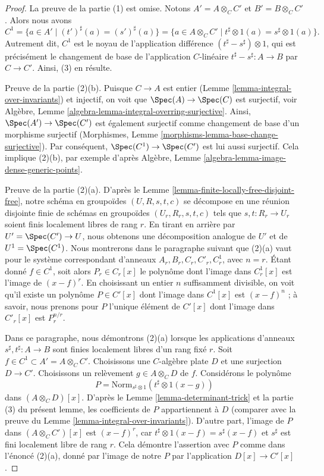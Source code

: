 \begin{proof}
La preuve de la partie (1) est omise. Notons $A' = A \otimes_C C'$ et
$B' = B \otimes_C C'$. Alors nous avons
$$
C^1
= \{a \in A' \mid (t')^\sharp(a) = (s')^\sharp(a) \}
= \{a \in A \otimes_C C' \mid t^\sharp \otimes 1(a) = s^\sharp \otimes 1(a) \}.
$$
Autrement dit, $C^1$ est le noyau de l'application différence
$(t^\sharp - s^\sharp) \otimes 1$, qui est précisément le changement de base
de l'application $C$-linéaire $t^\sharp - s^\sharp : A \to B$ par $C \to C'$.
Ainsi, (3) en résulte.

\medskip\noindent
Preuve de la partie (2)(b). Puisque $C \to A$ est entier
(Lemme \ref{lemma-integral-over-invariants}) et injectif, on voit que
$\Spec(A) \to \Spec(C)$ est surjectif, voir
Algèbre, Lemme \ref{algebra-lemma-integral-overring-surjective}.
Ainsi, $\Spec(A') \to \Spec(C')$ est également surjectif
comme changement de base d'un morphisme surjectif
(Morphismes, Lemme \ref{morphisms-lemma-base-change-surjective}).
Par conséquent, $\Spec(C^1) \to \Spec(C')$ est lui aussi surjectif.
Cela implique (2)(b), par exemple d'après
Algèbre, Lemme \ref{algebra-lemma-image-dense-generic-points}.

\medskip\noindent
Preuve de la partie (2)(a). D'après le Lemme \ref{lemma-finite-locally-free-disjoint-free},
notre schéma en groupoïdes $(U, R, s, t, c)$ se décompose en une réunion disjointe finie
de schémas en groupoïdes $(U_r, R_r, s, t, c)$ tels que $s, t : R_r \to U_r$
soient finis localement libres de rang $r$. En tirant en arrière par $U' = \Spec(C') \to U$,
nous obtenons une décomposition analogue de $U'$ et de $U^1 = \Spec(C^1)$.
Nous montrerons dans le paragraphe suivant que (2)(a) vaut pour le système correspondant
d'anneaux $A_r, B_r, C_r, C'_r, C^1_r$, avec $n = r$.
Étant donné $f \in C^1$, soit alors $P_r \in C_r[x]$ le polynôme
dont l'image dans $C^1_r[x]$ est l'image de $(x - f)^r$.
En choisissant un entier $n$ suffisamment divisible, on voit qu'il
existe un polynôme $P \in C'[x]$ dont l'image dans $C^1[x]$ est
$(x - f)^n$ ; à savoir, nous prenons pour $P$ l'unique élément de
$C'[x]$ dont l'image dans $C'_r[x]$ est $P_r^{n/r}$.

\medskip\noindent
Dans ce paragraphe, nous démontrons (2)(a) lorsque les applications d'anneaux
$s^\sharp, t^\sharp : A \to B$ sont finies localement libres d'un rang fixé $r$.
Soit $f \in C^1 \subset A' = A \otimes_C C'$. Choisissons une
$C$-algèbre plate $D$ et une surjection $D \to C'$. Choisissons un relèvement
$g \in A \otimes_C D$ de $f$.
Considérons le polynôme
$$
P = \text{Norm}_{s^\sharp \otimes 1}(t^\sharp \otimes 1(x - g))
$$
dans $(A \otimes_C D)[x]$. D'après le Lemme \ref{lemma-determinant-trick}
et la partie (3) du présent lemme, les coefficients de $P$ appartiennent à $D$
(comparer avec la preuve du Lemme \ref{lemma-integral-over-invariants}).
D'autre part, l'image de $P$ dans $(A \otimes_C C')[x]$ est
$(x - f)^r$, car $t^\sharp \otimes 1(x - f) = s^\sharp(x - f)$
et $s^\sharp$ est fini localement libre de rang $r$.
Cela démontre l'assertion avec $P$ comme dans l'énoncé (2)(a),
donné par l'image de notre $P$ par l'application $D[x] \to C'[x]$.
\end{proof}

